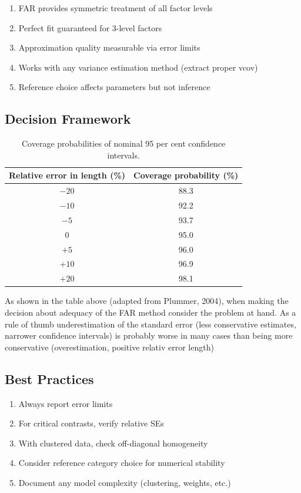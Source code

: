 \documentclass[11pt]{article}
\begin{document}
\begin{enumerate}
    \item FAR provides symmetric treatment of all factor levels
    \item Perfect fit guaranteed for 3-level factors
    \item Approximation quality measurable via error limits
    \item Works with any variance estimation method (extract proper vcov)
    \item Reference choice affects parameters but not inference
\end{enumerate}

\subsection{Decision Framework}

\begin{table}[h]
\centering
\caption{Coverage probabilities of nominal 95 per cent confidence intervals.}
\begin{tabular}{cc}
\hline
Relative error in length (\%) & Coverage probability (\%) \\
\hline
$-20$ & 88.3 \\
$-10$ & 92.2 \\
$-5$ & 93.7 \\
0 & 95.0 \\
$+5$ & 96.0 \\
$+10$ & 96.9 \\
$+20$ & 98.1 \\
\hline
\end{tabular}
\end{table}

As shown in the table above (adapted from Plummer, 2004), when making the decision about adequacy of the FAR method consider the problem at hand. As a rule of thumb underestimation of the standard error (less conservative estimates, narrower confidence intervals) is probably worse in many cases than being more conservative (overestimation, positive relativ error length)

\subsection{Best Practices}

\begin{enumerate}
    \item Always report error limits
    \item For critical contrasts, verify relative SEs
    \item With clustered data, check off-diagonal homogeneity
    \item Consider reference category choice for numerical stability
    \item Document any model complexity (clustering, weights, etc.)
\end{enumerate}
\end{document}
